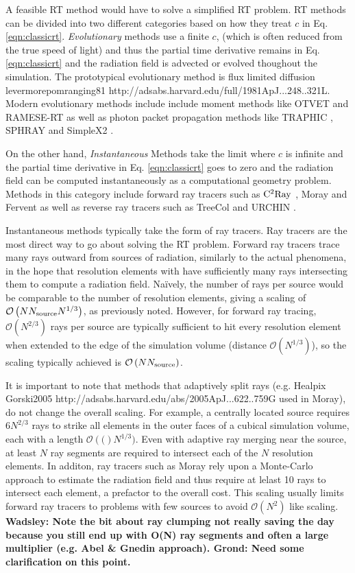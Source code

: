 \documentclass[fleq,usenatbib]{mnras}
\newcommand{\bigO}[1]{\mathcal{O}\left(#1\right)}
\newcommand{\comment}[1]{\textbf{\color{red}#1}}
\newcommand{\NS}{N_{\rm source}}
\begin{document}
A feasible RT method would have to solve a simplified RT problem.
RT methods can be divided into two different categories 
based on how they treat $c$ in Eq. \ref{eqn:classicrt}.  {\it Evolutionary} methods use a 
finite $c$, (which is often reduced from the true speed of light) and thus the partial time 
derivative remains in Eq. \ref{eqn:classicrt} and the radiation field 
is advected or evolved thoughout the simulation.  The prototypical evolutionary method
is flux limited diffusion levermorepomranging81 http://adsabs.harvard.edu/full/1981ApJ...248..321L.  Modern evolutionary methods include include moment methods like OTVET 
\citep{gnedinAbel01} and  RAMESE-RT \citep{rosdahlTeyssier15} as well as 
photon packet propagation methods like TRAPHIC \citep{pawlikSchaye08}, SPHRAY 
\citep{altayEt08} and SimpleX2 \citep{paardekooperEt10}.

On the other hand, {\it Instantaneous} Methods take the 
limit where $c$ is infinite and the partial time derivative in 
Eq. \ref{eqn:classicrt} goes to zero and the radiation field can be 
computed instantaneously as a computational geometry problem.  Methods in this category
include forward ray tracers such as $\rm C^2Ray$ 
\citep{mellemaEt06a}, Moray \citep{wiseAbel11} and Fervent 
\citep{baczynskiEt15} as well as reverse ray tracers such as TreeCol 
\citep{clarkEt12} and URCHIN \citep{altayTheuns13}. 

Instantaneous methods typically take the form of ray tracers. Ray tracers are 
the most direct way to go about solving the RT problem. Forward ray 
tracers trace many rays outward from sources of radiation, similarly to the 
actual phenomena, in the hope that resolution elements with have sufficiently many rays
intersecting them to compute a radiation field.
Na\"ively, the number of rays per 
source would be comparable to the number of resolution elements, giving a scaling 
of $\bigO{N \NS N^{1/3}}$, as previously noted.
However, for forward ray tracing, $\bigO{N^{2/3}}$ rays per source are typically sufficient to hit every resolution element when extended to the edge of the simulation volume (distance $\bigO{N^{1/3}}$), so the scaling typically achieved is $\bigO{N \NS}$.  

It is important to note that methods that adaptively split rays (e.g. Healpix Gorski2005 http://adsabs.harvard.edu/abs/2005ApJ...622..759G used in Moray), do not change the overall scaling.  For example, a centrally located source requires $6 N^{2/3}$ rays to strike all elements in the outer faces of a cubical simulation volume, each with a length $\bigO(N^{1/3})$.
Even with adaptive ray merging near the source, at least $N$ ray segments are required to intersect each of the $N$ resolution elements.
In additon, ray tracers such as Moray rely upon a Monte-Carlo approach to estimate the radiation field and thus require at lelast 10 rays to intersect each element, a prefactor to the overall cost.
This scaling usually limits forward ray tracers to 
problems with few sources to avoid $\mathcal{O}(N^2)$ like scaling. 
\comment{Wadsley: Note the bit about ray clumping not really saving 
the day because you still end up with O(N) ray segments and often a large 
multiplier (e.g. Abel \& Gnedin approach). Grond: Need some clarification on 
this point.}
\end{document}
